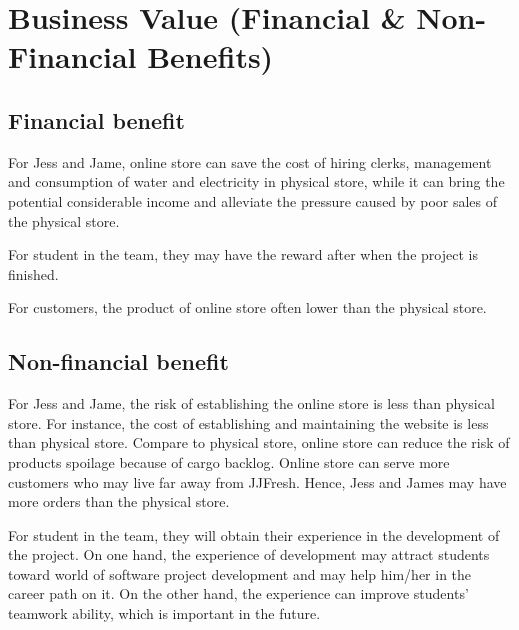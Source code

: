 \documentclass{report}
\begin{document}
\section{Business Value (Financial \& Non-Financial Benefits)}
\subsection{Financial benefit}



For Jess and Jame, online store can save the cost of hiring clerks, management and consumption of water and electricity in physical store, while it can bring the potential considerable income and alleviate the pressure caused by poor sales of the physical store.

For student in the team, they may have the reward after when the project is finished.

For customers, the product of online store often lower than the physical store.

\subsection{Non-financial benefit}
For Jess and Jame, the risk of establishing the online store is less than physical store. For instance, the cost of establishing and maintaining the website is less than physical store. Compare to physical store, online store can reduce the risk of products spoilage because of cargo backlog. Online store can serve more customers who may live far away from JJFresh. Hence, Jess and James may have more orders than the physical store.

For student in the team, they will obtain their experience in the development of the project. On one hand, the experience of development may attract students toward world of software project development and may help him/her in the career path on it. On the other hand, the experience can improve students' teamwork ability, which is important in the future.
\end{document}
